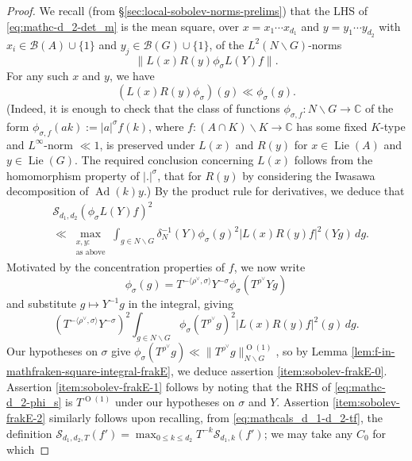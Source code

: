 \documentclass[reqno]{amsart}
\DeclareMathOperator{\Ad}{Ad}
\DeclareMathOperator{\Lie}{Lie}
\def\O{\operatorname{O}}
\theoremstyle{plain} \newtheorem{theorem} {Theorem}
\theoremstyle{definition} \newtheorem{definition} [theorem] {Definition}
\theoremstyle{itplain} %
\numberwithin{equation}{section}
\numberwithin{theorem}{section}
\renewcommand{\leq}{\leqslant}
\begin{document}
\begin{proof}
  We recall (from \S\ref{sec:local-sobolev-norms-prelims}) that the LHS of \eqref{eq:mathc-d_2-det_m} is the mean square, over $x = x_1 \dotsb x_{d_1}$ and $y = y_1 \dotsb y_{d_2}$ with $x_i \in \mathcal{B}(A) \cup \{1\}$ and $y_j \in \mathcal{B}(G) \cup \{1\}$, of the $L^2(N \backslash G)$-norms
  \begin{equation*}
    \|L(x) R(y) \phi_{\sigma} L(Y) f\|.
  \end{equation*}
  For any such $x$ and $y$, we have
  \begin{equation*}
    \left(
      L(x) R(y) \phi_{\sigma}
    \right)(g)
    \ll \phi_{\sigma}(g).
  \end{equation*}
  (Indeed, it is enough to check that the class of functions $\phi_{\sigma,f} : N \backslash G \rightarrow \mathbb{C}$ of the form $\phi_{\sigma,f}(a k) := |a|^{\sigma} f(k)$, where $f : (A \cap K) \backslash K \rightarrow \mathbb{C}$ has some fixed $K$-type and $L^\infty$-norm $\ll 1$, is preserved under $L(x)$ and $R(y)$ for $x \in \Lie(A)$ and $y \in \Lie(G)$.  The required conclusion concerning $L(x)$ follows from the homomorphism property of $|.|^{\sigma}$, that for $R(y)$ by considering the Iwasawa decomposition of $\Ad(k) y$.)  By the product rule for derivatives, we deduce that
  \begin{align*}
    &\mathcal{S}_{d_1,d_2} (\phi _\sigma  L(Y) f)^2 \\
    &\ll
    \max_{
      \substack{
        x,y:  \\
        \text{as above}
      }
    }
    \int _{g \in N \backslash G}
    \delta_N^{-1}(Y)
    \phi_\sigma(g)^2
    \left\lvert
      L(x) R(y) f
    \right\rvert^2(Y g) \, d g.
  \end{align*}
  Motivated by the concentration properties of $f$, we now write
  \begin{equation*}
    \phi_\sigma(g) = T^{-\langle \rho^\vee, \sigma  \rangle} Y^{-\sigma} \phi_\sigma(T^{\rho^\vee} Y g)
  \end{equation*}
  and substitute $g \mapsto Y^{-1} g$ in the integral, giving
  \begin{equation*}
    (T^{-\langle \rho^\vee, \sigma  \rangle} Y^{-\sigma})^2
    \int _{g \in N \backslash G}
    \phi_{\sigma} (T^{\rho^\vee} g)^2
    \left\lvert
      L(x) R(y) f
    \right\rvert^2(g) \, d g.
  \end{equation*}
  Our hypotheses on $\sigma$ give $\phi_{\sigma} (T^{\rho^\vee} g) \ll \|T^{\rho^\vee} g\|_{N \backslash G}^{\O(1)}$, so by Lemma \ref{lem:f-in-mathfraken-square-integral-frakE}, we deduce assertion \eqref{item:sobolev-frakE-0}.  Assertion \eqref{item:sobolev-frakE-1} follows by noting that the RHS of \eqref{eq:mathc-d_2-phi_s} is $T^{\O(1)}$ under our hypotheses on $\sigma$ and $Y$.  Assertion \eqref{item:sobolev-frakE-2} similarly follows upon recalling, from \eqref{eq:mathcals_d_1-d_2-tf}, the definition $\mathcal{S}_{d_1,d_2,T}(f') = \max_{0 \leq k \leq d_2} T^{-k} \mathcal{S}_{d_1,k}(f')$; we may take any $C_0$ for which

\end{proof}
\end{document}
